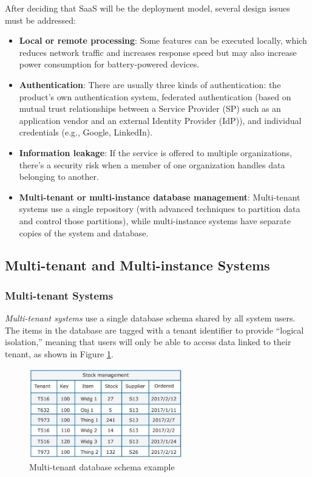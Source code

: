 \noindent
After deciding that SaaS will be the deployment model, several design issues must be addressed:

\begin{itemize}
    \item \textbf{Local or remote processing}: Some features can be executed locally, which reduces network traffic and increases response speed but may also increase power consumption for battery-powered devices.
    \item \textbf{Authentication}: There are usually three kinds of authentication: the product’s own authentication system, federated authentication (based on mutual trust relationships between a Service Provider (SP) such as an application vendor and an external Identity Provider (IdP)), and individual credentials (e.g., Google, LinkedIn).
    \item \textbf{Information leakage}: If the service is offered to multiple organizations, there's a security risk when a member of one organization handles data belonging to another.
    \item \textbf{Multi-tenant or multi-instance database management}: Multi-tenant systems use a single repository (with advanced techniques to partition data and control those partitions), while multi-instance systems have separate copies of the system and database.
\end{itemize}

\subsection{Multi-tenant and Multi-instance Systems}

\subsubsection{Multi-tenant Systems}
\textit{Multi-tenant systems} use a single database schema shared by all system users. The items in the database are tagged with a tenant identifier to provide “logical isolation,” meaning that users will only be able to access data linked to their tenant, as shown in Figure \ref{fig:multi-tenant-example}.

\begin{figure}[H]
    \centering
    \includegraphics[width=0.6\textwidth]{images/Cloud/multi-tenant-example.PNG}
    \caption{Multi-tenant database schema example}
    \label{fig:multi-tenant-example}
\end{figure}

